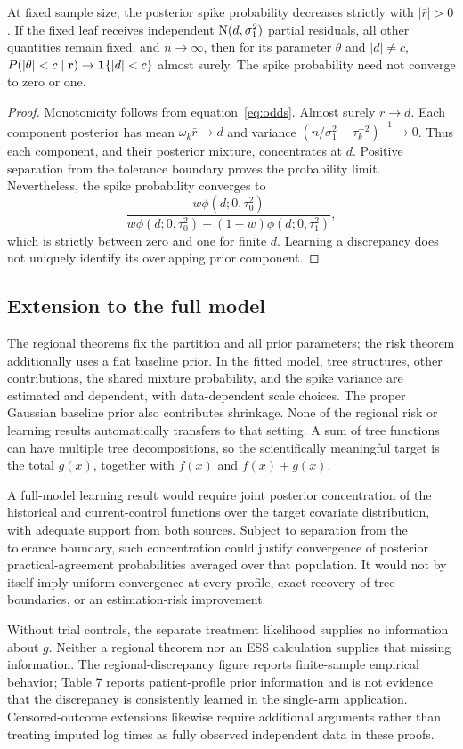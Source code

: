 \begin{lemma}\label{lem:leaf_learning}
At fixed sample size, the posterior spike probability decreases strictly with $|\bar r|>0$. If the fixed leaf receives independent $\mathrm{N}(d,\sigma_1^2)$ partial residuals, all other quantities remain fixed, and $n\to\infty$, then for its parameter $\theta$ and $|d|\ne c$,
$P(|\theta|<c\mid\mathbf r)\to\mathbf{1}\{|d|<c\}$ almost surely. The spike probability need not converge to zero or one.
\end{lemma}
\begin{proof}
Monotonicity follows from equation~\eqref{eq:odds}. Almost surely $\bar r\to d$. Each component posterior has mean $\omega_k\bar r\to d$ and variance $(n/\sigma_1^2+\tau_k^{-2})^{-1}\to0$. Thus each component, and their posterior mixture, concentrates at $d$. Positive separation from the tolerance boundary proves the probability limit. Nevertheless, the spike probability converges to
\[
\frac{w\phi(d;0,\tau_0^2)}{w\phi(d;0,\tau_0^2)+(1-w)\phi(d;0,\tau_1^2)},
\]
which is strictly between zero and one for finite $d$. Learning a discrepancy does not uniquely identify its overlapping prior component.
\end{proof}

\subsection{Extension to the full model}\label{sec:C.6}
The regional theorems fix the partition and all prior parameters; the risk theorem additionally uses a flat baseline prior. In the fitted model, tree structures, other contributions, the shared mixture probability, and the spike variance are estimated and dependent, with data-dependent scale choices. The proper Gaussian baseline prior also contributes shrinkage. None of the regional risk or learning results automatically transfers to that setting. A sum of tree functions can have multiple tree decompositions, so the scientifically meaningful target is the total $g(x)$, together with $f(x)$ and $f(x)+g(x)$.

A full-model learning result would require joint posterior concentration of the historical and current-control functions over the target covariate distribution, with adequate support from both sources. Subject to separation from the tolerance boundary, such concentration could justify convergence of posterior practical-agreement probabilities averaged over that population. It would not by itself imply uniform convergence at every profile, exact recovery of tree boundaries, or an estimation-risk improvement.

Without trial controls, the separate treatment likelihood supplies no information about $g$. Neither a regional theorem nor an ESS calculation supplies that missing information. The regional-discrepancy figure reports finite-sample empirical behavior; Table 7 reports patient-profile prior information and is not evidence that the discrepancy is consistently learned in the single-arm application. Censored-outcome extensions likewise require additional arguments rather than treating imputed log times as fully observed independent data in these proofs.
